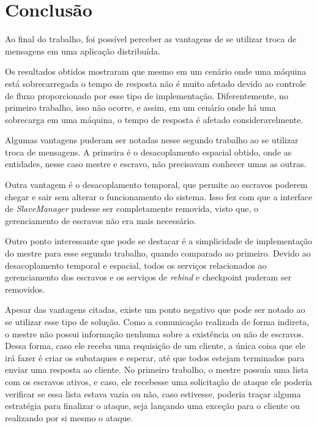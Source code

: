 \documentclass[
	12pt,				%
    oneside,			%
	a4paper,			%
	english,			%
	brazil,				%
	]{abntex2}
\begin{document}
\chapter{Conclusão}

Ao final do trabalho, foi possível perceber as vantagens de se utilizar troca de mensagens em uma aplicação distribuída. 

Os resultados obtidos mostraram que mesmo em um cenário onde uma máquina está sobrecarregada o tempo de resposta não é muito afetado devido ao controle de fluxo proporcionado por esse tipo de implementação. Diferentemente, no primeiro trabalho, isso não ocorre, e assim, em um cenário onde há uma sobrecarga em uma máquina, o tempo de resposta é afetado consideravelmente.

Algumas vantagens puderam ser notadas nesse segundo trabalho ao se utilizar troca de mensagens. A primeira é o desacoplamento espacial obtido, onde as entidades, nesse caso mestre e escravo, não precisavam conhecer umas as outras.

Outra vantagem é o desacoplamento temporal, que permite ao escravos poderem chegar e sair sem alterar o funcionamento do sistema. Isso fez com que a interface de \textit{SlaveManager} pudesse ser completamente removida, visto que, o gerenciamento de escravos não era mais necessário. 

Outro ponto interessante que pode se destacar é a simplicidade de implementação do mestre para esse segundo trabalho, quando comparado ao primeiro. Devido ao desacoplamento temporal e espacial, todos os serviços relacionados ao gerenciamento dos escravos e os serviços de \textit{rebind} e checkpoint puderam ser removidos.

Apesar das vantagens citadas, existe um ponto negativo que pode ser notado ao se utilizar esse tipo de solução. Como a comunicação realizada de forma indireta, o mestre não possui informação nenhuma sobre a existência ou não de escravos. Dessa forma, caso ele receba uma requisição de um cliente, a única coisa que ele irá fazer é criar os subataques e esperar, até que todos estejam terminados para enviar uma resposta ao cliente. No primeiro trabalho, o mestre possuía uma lista com os escravos ativos, e caso, ele recebesse uma solicitação de ataque ele poderia verificar se essa lista estava vazia ou não, caso estivesse, poderia traçar alguma estratégia para finalizar o ataque, seja lançando uma exceção para o cliente ou realizando por si mesmo o ataque.




\postextual


\end{document}

